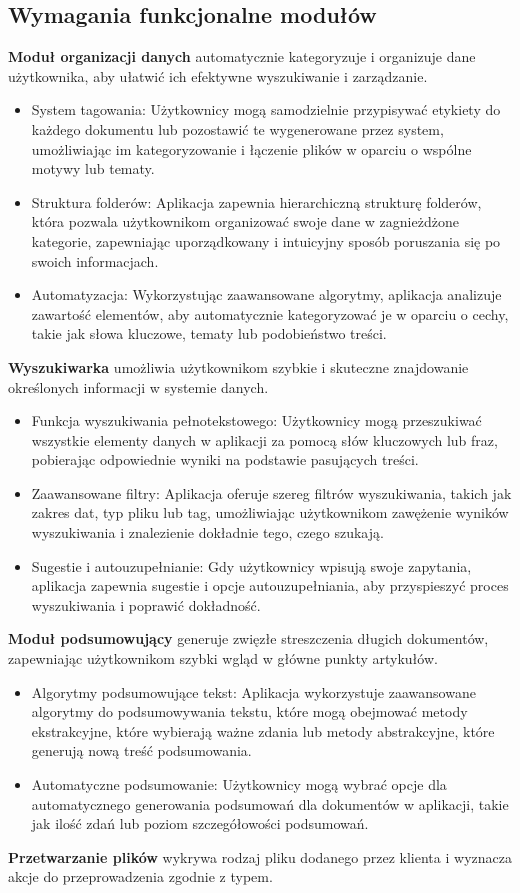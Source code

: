 \documentclass[12pt,a4paper,twoside]{article}
\begin{document}
\subsection{Wymagania funkcjonalne modułów}
\textbf{Moduł organizacji danych} automatycznie kategoryzuje i organizuje dane użytkownika, aby ułatwić ich efektywne wyszukiwanie i zarządzanie.
\begin{itemize}
	\item System tagowania: Użytkownicy mogą samodzielnie przypisywać etykiety do każdego dokumentu lub pozostawić te wygenerowane przez system, umożliwiając im kategoryzowanie i łączenie plików w oparciu o wspólne motywy lub tematy.
	\item Struktura folderów: Aplikacja zapewnia hierarchiczną strukturę folderów, która pozwala użytkownikom organizować swoje dane w zagnieżdżone kategorie, zapewniając uporządkowany i intuicyjny sposób poruszania się po swoich informacjach.
	\item Automatyzacja: Wykorzystując zaawansowane algorytmy, aplikacja analizuje zawartość elementów, aby automatycznie kategoryzować je w oparciu o cechy, takie jak słowa kluczowe, tematy lub podobieństwo treści.
\end{itemize}\par
\textbf{Wyszukiwarka} umożliwia użytkownikom szybkie i skuteczne znajdowanie określonych informacji w systemie danych.
\begin{itemize}
	\item Funkcja wyszukiwania pełnotekstowego: Użytkownicy mogą przeszukiwać wszystkie elementy danych w aplikacji za pomocą słów kluczowych lub fraz, pobierając odpowiednie wyniki na podstawie pasujących treści.
	\item Zaawansowane filtry: Aplikacja oferuje szereg filtrów wyszukiwania, takich jak zakres dat, typ pliku lub tag, umożliwiając użytkownikom zawężenie wyników wyszukiwania i znalezienie dokładnie tego, czego szukają.
	\item Sugestie i autouzupełnianie: Gdy użytkownicy wpisują swoje zapytania, aplikacja zapewnia sugestie i opcje autouzupełniania, aby przyspieszyć proces wyszukiwania i poprawić dokładność.
\end{itemize}\par
\textbf{Moduł podsumowujący} generuje zwięzłe streszczenia długich dokumentów, zapewniając użytkownikom szybki wgląd w główne punkty artykułów.
\begin{itemize}
	\item Algorytmy podsumowujące tekst: Aplikacja wykorzystuje zaawansowane algorytmy do podsumowywania tekstu, które mogą obejmować metody ekstrakcyjne, które wybierają ważne zdania lub metody abstrakcyjne, które generują nową treść podsumowania.
	\item Automatyczne podsumowanie: Użytkownicy mogą wybrać opcje dla automatycznego generowania podsumowań dla dokumentów w aplikacji, takie jak ilość zdań lub poziom szczegółowości podsumowań.
\end{itemize}\par
\textbf{Przetwarzanie plików} wykrywa rodzaj pliku dodanego przez klienta i wyznacza akcje do przeprowadzenia zgodnie z typem. 
\end{document}
